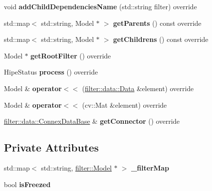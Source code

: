 \begin{DoxyCompactItemize}
\item 
\mbox{\label{classjson_1_1_json_filter_tree_a5d2806db27fed87671d81edd42d2b115}} 
void {\bfseries add\+Child\+Dependencies\+Name} (std\+::string filter) override
\item 
\mbox{\label{classjson_1_1_json_filter_tree_a44e9e49893a0e6ec05f9ca6aec75bef1}} 
std\+::map$<$ std\+::string, Model $\ast$ $>$ {\bfseries get\+Parents} () const override
\item 
\mbox{\label{classjson_1_1_json_filter_tree_ab89a669e72f33e91d0a45fc2ecb91d48}} 
std\+::map$<$ std\+::string, Model $\ast$ $>$ {\bfseries get\+Childrens} () const override
\item 
\mbox{\label{classjson_1_1_json_filter_tree_aa9bae8460f9c00e192df60af2cfdc349}} 
Model $\ast$ {\bfseries get\+Root\+Filter} () override
\item 
\mbox{\label{classjson_1_1_json_filter_tree_acb2e753dee058d7e2fd4c4762907aafb}} 
Hipe\+Status {\bfseries process} () override
\item 
\mbox{\label{classjson_1_1_json_filter_tree_a084c6237ec65706435e65ba7faf33614}} 
Model \& {\bfseries operator$<$$<$} (\hyperlink{classfilter_1_1data_1_1_data}{filter\+::data\+::\+Data} \&element) override
\item 
\mbox{\label{classjson_1_1_json_filter_tree_a3bf55b00af6311ab6d7c65f601aa0768}} 
Model \& {\bfseries operator$<$$<$} (cv\+::\+Mat \&element) override
\item 
\mbox{\label{classjson_1_1_json_filter_tree_a5a1e8e82b1bd1d6408723729da472ff2}} 
\hyperlink{classfilter_1_1data_1_1_connex_data_base}{filter\+::data\+::\+Connex\+Data\+Base} \& {\bfseries get\+Connector} () override
\end{DoxyCompactItemize}
\subsection*{Private Attributes}
\begin{DoxyCompactItemize}
\item 
\mbox{\label{classjson_1_1_json_filter_tree_a4853220cfcc821cbed27144a29cb5895}} 
std\+::map$<$ std\+::string, \hyperlink{classfilter_1_1_model}{filter\+::\+Model} $\ast$ $>$ {\bfseries \+\_\+filter\+Map}
\item 
\mbox{\label{classjson_1_1_json_filter_tree_a957ebaeb10e36f66d06f7187a7c36b67}} 
bool {\bfseries is\+Freezed}
\end{DoxyCompactItemize}
